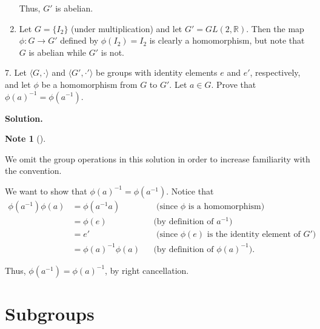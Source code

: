 \documentclass[10pt,]{book}
\theoremstyle{plain}
\theoremstyle{definition}
\theoremstyle{definition}
\newtheorem{note}[theorem]{Note}
\theoremstyle{definition}
\theoremstyle{definition}
\numberwithin{equation}{section}
\def\R{\mathbb{R}}
\newcommand{\amp}{ & }
\begin{document}
\begin{exerciselist}
\begin{enumerate}[label=(\alph*)]
          Thus, \(G'\) is abelian.
\item\hypertarget{li-185}{}
          Let \(G=\{I_2\}\) (under multiplication) and let \(G'=GL(2,\R)\). Then the map \(\phi: G\to G'\) defined by \(\phi(I_2)=I_2\) is clearly a homomorphism, but note that \(G\) is abelian while \(G'\) is not.
\end{enumerate}
\item[7.]\hypertarget{exercise-27}{}
        Let \(\langle G,\cdot\rangle\) and \(\langle G',\cdot'\rangle\) be groups with identity elements \(e\) and \(e'\), respectively, and let \(\phi\) be a homomorphism from \(G\) to \(G'\). Let \(a\in G\). Prove that \(\phi(a)^{-1}=\phi(a^{-1})\).
\par\smallskip
\par\smallskip
\noindent\textbf{Solution.}\hypertarget{solution-27}{}\quad
\begin{note}[]\label{note-9}

      We omit the group operations in this solution in order to increase familiarity with the convention.
\end{note}

      We want to show that \(\phi(a)^{-1}=\phi(a^{-1})\).
      Notice that
\begin{align*}
\phi(a^{-1})\phi(a)\amp =\phi(a^{-1}a)\amp \amp \text{ (since \(\phi\) is a homomorphism) }\\
\amp =\phi(e)\amp \amp \text{(by definition of \(a^{-1}\))}\\
\amp =e'\amp \amp  \text{ (since \(\phi(e)\) is the identity element of
        \(G'\)) }\\
\amp =\phi(a)^{-1}\phi(a)\amp \amp \text{(by definition of \(\phi(a)^{-1}\))} .
\end{align*}

\par

      Thus, \(\phi(a^{-1})=\phi(a)^{-1}\), by right cancellation.
\end{exerciselist}
\typeout{************************************************}
\typeout{************************************************}
\chapter[{Subgroups}]{Subgroups}\label{subgps}
\typeout{************************************************}
\typeout{************************************************}
\end{document}

